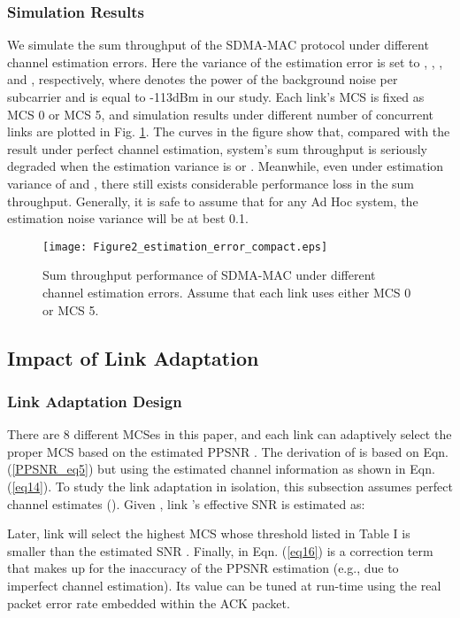 \documentclass[journal, final]{IEEEtran}
\begin{document}
\subsubsection{Simulation Results}

We simulate the sum throughput of the SDMA-MAC protocol under different
channel estimation errors. Here the variance of the estimation error is set
to , , , 
and , respectively, where  denotes the
power of the background noise per subcarrier and is equal to -113dBm in our study. Each
link's MCS is fixed as MCS 0 or MCS 5, and simulation results under
different number of concurrent links are plotted in Fig. \ref{Fig2_estimation_error}. The curves in
the figure show that, compared with the result under perfect channel
estimation, system's sum throughput is seriously degraded when the
estimation variance is  or . Meanwhile, even
under estimation variance of  and , there
still exists considerable performance loss in the sum throughput. Generally, it is safe to
assume that for any Ad Hoc system, the estimation noise variance will be at
best 0.1.

\begin{figure}
\centering
\texttt{[image: Figure2\_estimation\_error\_compact.eps]}
\caption{Sum throughput performance of SDMA-MAC under different channel estimation errors. Assume that each link uses either MCS 0 or MCS 5.}
\label{Fig2_estimation_error}
\end{figure}

\subsection{Impact of Link Adaptation}

\subsubsection{Link Adaptation Design}

There are 8 different MCSes in this paper, and each
link can adaptively select the proper MCS based on the estimated PPSNR . The derivation of  is based on Eqn. (\ref{PPSNR_eq5}) but using the estimated channel information as shown in Eqn. (\ref{eq14}). To
study the link adaptation in isolation, this subsection assumes perfect channel
estimates (). Given , link 's effective SNR is estimated as:

Later, link  will select the
highest MCS whose threshold listed in Table I is smaller than the estimated SNR . Finally,  in Eqn. (\ref{eq16}) is a correction term that makes up for
the inaccuracy of the PPSNR estimation (e.g., due to imperfect channel estimation). Its value can be
tuned at run-time using the real packet error rate embedded within the
ACK packet.
\end{document}
